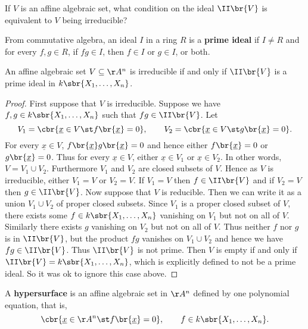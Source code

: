 If $ V $ is an affine algebraic set, what condition on the ideal $ \II\br{V} $ is equivalent to $ V $ being irreducible?


\begin{definition*}
From commutative algebra, an ideal $ I $ in a ring $ R $ is a \textbf{prime ideal} if $ I \ne R $ and for every $ f, g \in R $, if $ fg \in I $, then $ f \in I $ or $ g \in I $, or both.
\end{definition*}

\begin{lemma}
\label{lem:irreducibleprime}
An affine algebraic set $ V \subseteq \AA^n $ is irreducible if and only if $ \II\br{V} $ is a prime ideal in $ k\sbr{X_1, \dots, X_n} $.
\end{lemma}

\begin{proof}
First suppose that $ V $ is irreducible. Suppose we have $ f, g \in k\sbr{X_1, \dots, X_n} $ such that $ fg \in \II\br{V} $. Let
$$ V_1 = \cbr{\underline{x} \in V \st f\br{\underline{x}} = 0}, \qquad V_2 = \cbr{\underline{x} \in V \st g\br{\underline{x}} = 0}. $$
For every $ \underline{x} \in V $, $ f\br{\underline{x}}g\br{\underline{x}} = 0 $ and hence either $ f\br{\underline{x}} = 0 $ or $ g\br{\underline{x}} = 0 $. Thus for every $ \underline{x} \in V $, either $ \underline{x} \in V_1 $ or $ \underline{x} \in V_2 $. In other words, $ V = V_1 \cup V_2 $. Furthermore $ V_1 $ and $ V_2 $ are closed subsets of $ V $. Hence as $ V $ is irreducible, either $ V_1 = V $ or $ V_2 = V $. If $ V_1 = V $ then $ f \in \II\br{V} $ and if $ V_2 = V $ then $ g \in \II\br{V} $. Now suppose that $ V $ is reducible. Then we can write it as a union $ V_1 \cup V_2 $ of proper closed subsets. Since $ V_1 $ is a proper closed subset of $ V $, there exists some $ f \in k\sbr{X_1, \dots, X_n} $ vanishing on $ V_1 $ but not on all of $ V $. Similarly there exists $ g $ vanishing on $ V_2 $ but not on all of $ V $. Thus neither $ f $ nor $ g $ is in $ \II\br{V} $, but the product $ fg $ vanishes on $ V_1 \cup V_2 $ and hence we have $ fg \in \II\br{V} $. Thus $ \II\br{V} $ is not prime. Then $ V $ is empty if and only if $ \II\br{V} = k\sbr{X_1, \dots, X_n} $, which is explicitly defined to not be a prime ideal. So it was ok to ignore this case above.
\end{proof}

\pagebreak

\begin{definition*}
A \textbf{hypersurface} is an affine algebraic set in $ \AA^n $ defined by one polynomial equation, that is,
$$ \cbr{\underline{x} \in \AA^n \st f\br{\underline{x}} = 0}, \qquad f \in k\sbr{X_1, \dots, X_n}. $$
\end{definition*}


